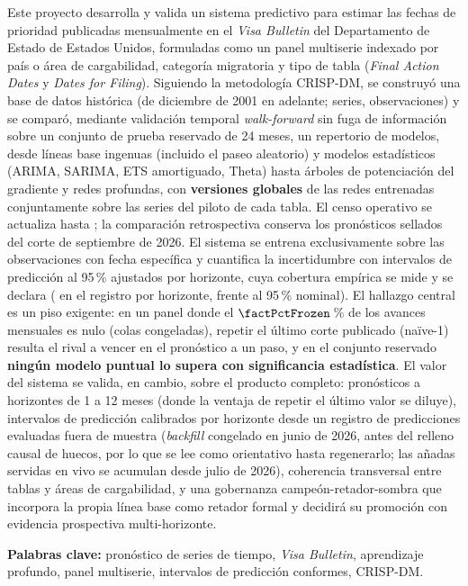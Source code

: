 \documentclass[12pt,letterpaper]{report}
\begin{document}
Este proyecto desarrolla y valida un sistema predictivo para estimar las fechas de
prioridad publicadas mensualmente en el \textit{Visa Bulletin} del Departamento de Estado
de Estados Unidos, formuladas como un panel multiserie indexado por país o área de
cargabilidad, categoría migratoria y tipo de tabla (\textit{Final Action Dates} y
\textit{Dates for Filing}). Siguiendo la metodología CRISP-DM, se construyó una base de
datos histórica (de diciembre de 2001 en adelante; \factNSeriesStructural{} series, \factNObsFmt{} observaciones) y se comparó,
mediante validación temporal \textit{walk-forward} sin fuga de información sobre un conjunto
de prueba reservado de 24 meses, un repertorio de \factNModels{} modelos, desde líneas base ingenuas
(incluido el paseo aleatorio) y modelos estadísticos (ARIMA, SARIMA, ETS amortiguado, Theta)
hasta árboles de potenciación del gradiente y redes profundas, con \textbf{versiones
globales} de las redes entrenadas conjuntamente sobre las series del piloto de cada tabla.
El censo operativo se actualiza hasta \factDateLast{}; la comparación
retrospectiva conserva los pronósticos sellados del corte de septiembre de 2026. El sistema se entrena
exclusivamente sobre las observaciones con fecha específica y cuantifica la incertidumbre con
intervalos de predicción al 95\,\% ajustados por horizonte, cuya cobertura empírica se mide
y se declara (\factProspCovNineFive{} en el registro por horizonte, frente al 95\,\% nominal). El hallazgo central es un piso exigente: en un panel donde el
$\factPctFrozen$\,\% de los avances mensuales es nulo (colas congeladas), repetir el último
corte publicado (naïve-1) resulta el rival a vencer en el pronóstico a un paso, y en el conjunto
reservado \textbf{ningún modelo puntual lo supera con significancia estadística}. El valor del sistema
se valida, en cambio, sobre el producto completo: pronósticos a horizontes de 1 a 12 meses
(donde la ventaja de repetir el último valor se diluye), intervalos de predicción calibrados
por horizonte desde un registro de \factProspNScoredFmt{} predicciones evaluadas fuera de
muestra (\textit{backfill} congelado en junio de 2026, antes del relleno causal de huecos, por lo que se lee como
orientativo hasta regenerarlo; las añadas servidas en vivo se acumulan
desde julio de 2026), coherencia transversal entre tablas y áreas de cargabilidad, y una gobernanza
campeón-retador-sombra que incorpora la propia línea base como retador formal y decidirá su
promoción con evidencia prospectiva multi-horizonte.

\vspace{0.6em}
\noindent\textbf{Palabras clave:} pronóstico de series de tiempo, \textit{Visa Bulletin},
aprendizaje profundo, panel multiserie, intervalos de predicción conformes, CRISP-DM.
\end{document}
